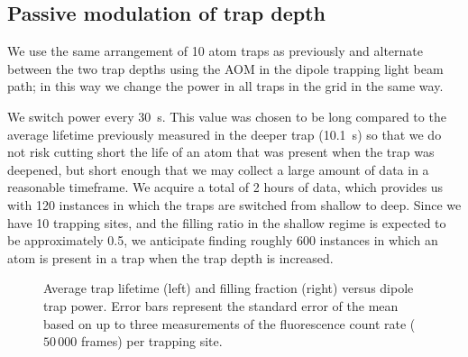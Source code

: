 \documentclass[../Thesis-IJspeert.tex]{subfiles}
\begin{document}
\subsection{Passive modulation of trap depth}
We use the same arrangement of \num{10} atom traps as previously and alternate between the two trap depths using the AOM in the dipole trapping light beam path; in this way we change the power in all traps in the grid in the same way.

We switch power every \SI{30}{\s}. This value was chosen to be long compared to the average lifetime previously measured in the deeper trap (\SI{10.1}{\s}) so that we do not risk cutting short the life of an atom that was present when the trap was deepened, but short enough that we may collect a large amount of data in a reasonable timeframe. We acquire a total of \num{2} hours of data, which provides us with \num{120} instances in which the traps are switched from shallow to deep. Since we have \num{10} trapping sites, and the filling ratio in the shallow regime is expected to be approximately \num{0.5}, we anticipate finding roughly \num{600} instances in which an atom is present in a trap when the trap depth is increased.

\begin{figure}[!t]
	\centering
	\caption[An example of a floating figure]{Average trap lifetime (left) and filling fraction (right) versus dipole trap power. Error bars represent the standard error of the mean based on up to three measurements of the fluorescence count rate ($50\,000$ frames) per trapping site.} %
	\label{fig:LTandFR} 
\end{figure}
\end{document}
